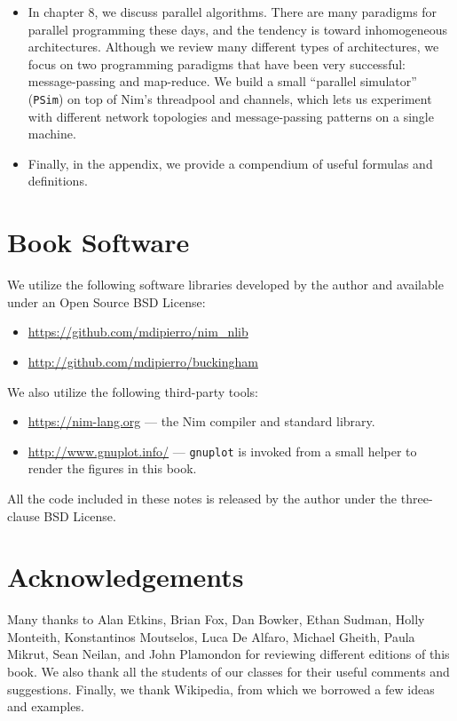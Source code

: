 \documentclass[justified, sixbynine]{tufte-book}
\def\ft{\small\tt}
\theoremstyle{plain}%
\newtheorem * {corollary}{Corollary}
\theoremstyle{definition}
\theoremstyle{remark}
\newtheorem * {remark}{Remark}
\newtheorem * {note}{Note}
\begin{document}
\begin{fullwidth}
\begin{itemize}
\item In chapter 8, we discuss parallel algorithms. There are many paradigms for parallel programming these days, and the tendency is toward inhomogeneous architectures. Although we review many different types of architectures, we focus on two programming paradigms that have been very successful: message-passing and map-reduce. We build a small ``parallel simulator'' ({\ft PSim}) on top of Nim's threadpool and channels, which lets us experiment with different network topologies and message-passing patterns on a single machine.

\item Finally, in the appendix, we provide a compendium of useful formulas and definitions.
\end{itemize}

\section{Book Software}

We utilize the following software libraries developed by the author and available under an Open Source BSD License:

\begin{itemize}
\item \url{https://github.com/mdipierro/nim_nlib}
\item \url{http://github.com/mdipierro/buckingham}
\end{itemize}

We also utilize the following third-party tools:

\begin{itemize}
\item \url{https://nim-lang.org} --- the Nim compiler and standard library.
\item \url{http://www.gnuplot.info/} --- {\ft gnuplot} is invoked from a small helper to render the figures in this book.
\end{itemize}

All the code included in these notes is released by the author under the three-clause BSD License.

\section * {Acknowledgements}

Many thanks to Alan Etkins, Brian Fox, Dan Bowker, Ethan Sudman, Holly Monteith, Konstantinos Moutselos, Luca De Alfaro, Michael Gheith, Paula Mikrut, Sean Neilan, and John Plamondon for reviewing different editions of this book. We also thank all the students of our classes for their useful comments and suggestions. Finally, we thank Wikipedia, from which we borrowed a few ideas and examples.


\end{fullwidth}
\end{document}
